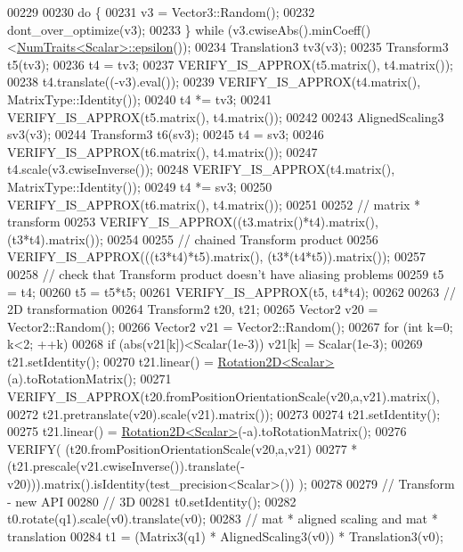\begin{DoxyCode}
00229 
00230   \textcolor{keywordflow}{do} \{
00231     v3 = Vector3::Random();
00232     dont\_over\_optimize(v3);
00233   \} \textcolor{keywordflow}{while} (v3.cwiseAbs().minCoeff()<\hyperlink{group___core___module_struct_eigen_1_1_num_traits}{NumTraits<Scalar>::epsilon}());
00234   Translation3 tv3(v3);
00235   Transform3 t5(tv3);
00236   t4 = tv3;
00237   VERIFY\_IS\_APPROX(t5.matrix(), t4.matrix());
00238   t4.translate((-v3).eval());
00239   VERIFY\_IS\_APPROX(t4.matrix(), MatrixType::Identity());
00240   t4 *= tv3;
00241   VERIFY\_IS\_APPROX(t5.matrix(), t4.matrix());
00242 
00243   AlignedScaling3 sv3(v3);
00244   Transform3 t6(sv3);
00245   t4 = sv3;
00246   VERIFY\_IS\_APPROX(t6.matrix(), t4.matrix());
00247   t4.scale(v3.cwiseInverse());
00248   VERIFY\_IS\_APPROX(t4.matrix(), MatrixType::Identity());
00249   t4 *= sv3;
00250   VERIFY\_IS\_APPROX(t6.matrix(), t4.matrix());
00251 
00252   \textcolor{comment}{// matrix * transform}
00253   VERIFY\_IS\_APPROX((t3.matrix()*t4).matrix(), (t3*t4).matrix());
00254 
00255   \textcolor{comment}{// chained Transform product}
00256   VERIFY\_IS\_APPROX(((t3*t4)*t5).matrix(), (t3*(t4*t5)).matrix());
00257 
00258   \textcolor{comment}{// check that Transform product doesn't have aliasing problems}
00259   t5 = t4;
00260   t5 = t5*t5;
00261   VERIFY\_IS\_APPROX(t5, t4*t4);
00262 
00263   \textcolor{comment}{// 2D transformation}
00264   Transform2 t20, t21;
00265   Vector2 v20 = Vector2::Random();
00266   Vector2 v21 = Vector2::Random();
00267   \textcolor{keywordflow}{for} (\textcolor{keywordtype}{int} k=0; k<2; ++k)
00268     \textcolor{keywordflow}{if} (abs(v21[k])<Scalar(1e-3)) v21[k] = Scalar(1e-3);
00269   t21.setIdentity();
00270   t21.linear() = \hyperlink{group___geometry___module_class_eigen_1_1_rotation2_d}{Rotation2D<Scalar>}(a).toRotationMatrix();
00271   VERIFY\_IS\_APPROX(t20.fromPositionOrientationScale(v20,a,v21).matrix(),
00272     t21.pretranslate(v20).scale(v21).matrix());
00273 
00274   t21.setIdentity();
00275   t21.linear() = \hyperlink{group___geometry___module_class_eigen_1_1_rotation2_d}{Rotation2D<Scalar>}(-a).toRotationMatrix();
00276   VERIFY( (t20.fromPositionOrientationScale(v20,a,v21)
00277         * (t21.prescale(v21.cwiseInverse()).translate(-v20))).matrix().isIdentity(test\_precision<Scalar>())
       );
00278 
00279   \textcolor{comment}{// Transform - new API}
00280   \textcolor{comment}{// 3D}
00281   t0.setIdentity();
00282   t0.rotate(q1).scale(v0).translate(v0);
00283   \textcolor{comment}{// mat * aligned scaling and mat * translation}
00284   t1 = (Matrix3(q1) * AlignedScaling3(v0)) * Translation3(v0);

\end{DoxyCode}
